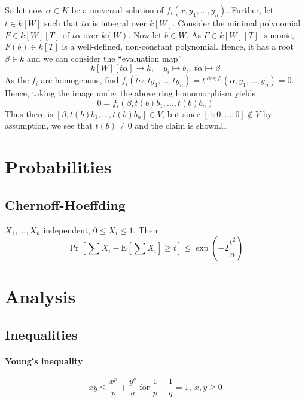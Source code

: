 \documentclass{scrartcl}
\newcommand{\Ex}{\mathrm{E}}
\begin{document}
So let now $\alpha \in K$ be a universal solution of $f_i(x, y_1, ..., y_n)$.
Further, let $t \in k[W]$ such that $t\alpha$ is integral over $k[W]$.
Consider the minimal polynomial $F \in k[W][T]$ of $t\alpha$ over $k(W)$.
Now let $b \in W$. As $F \in k[W][T]$ is monic, $F(b) \in k[T]$ is a well-defined, non-constant polynomial.
Hence, it has a root $\beta \in k$ and we can consider the ``evaluation map''
\begin{equation*}
    k[W][t\alpha] \to k, \quad y_i \mapsto b_i, \ t\alpha \mapsto \beta
\end{equation*}
As the $f_i$ are homogenous, find $f_i(t\alpha, ty_1, ..., ty_n) = t^{\deg f_i}(\alpha, y_1, ..., y_n) = 0$.
Hence, taking the image under the above ring homomorphism yields
\begin{equation*}
    0 = f_i(\beta, t(b) b_1, ..., t(b) b_n)
\end{equation*}
Thus there is $[\beta, t(b) b_1, ..., t(b) b_n] \in V$, but since $[1 : 0 : ... : 0] \notin V$ by assumption, we see that $t(b) \neq 0$ and the claim is shown.$\hfill\square$

\section{Probabilities}

\subsection{Chernoff-Hoeffding}
$X_1, ..., X_n$ independent, $0 \leq X_i \leq 1$. Then
\begin{equation}
    \Pr\left[\sum X_i - \Ex\left[\sum X_i\right] \geq t\right] \leq \exp\left(-2\frac {t^2} n\right) \nonumber
\end{equation}

\section{Analysis}

\subsection{Inequalities}

\paragraph{Young's inequality}
\begin{equation}
    xy \leq \frac {x^p} p + \frac {y^q} q \text{ for } \frac 1 p + \frac 1 q = 1, \ x, y \geq 0 \nonumber
\end{equation}
\end{document}
